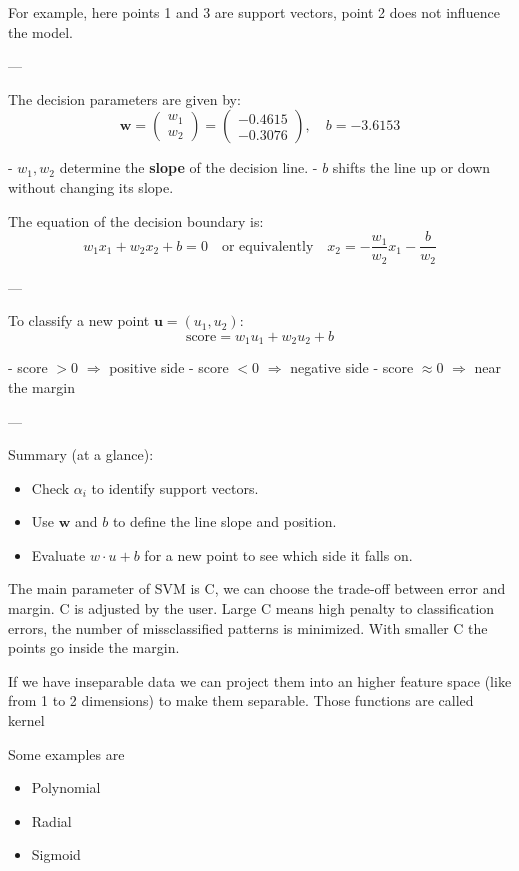 For example, here points 1 and 3 are support vectors, point 2 does not influence the model.

---

The decision parameters are given by:
\[
\mathbf{w} = 
\begin{pmatrix} w_1 \\ w_2 \end{pmatrix} =
\begin{pmatrix} -0.4615 \\ -0.3076 \end{pmatrix}, 
\quad b = -3.6153
\]

- $w_1, w_2$ determine the \textbf{slope} of the decision line.
- $b$ shifts the line up or down without changing its slope.

The equation of the decision boundary is:
\[
w_1 x_1 + w_2 x_2 + b = 0 \quad \text{or equivalently} \quad x_2 = -\frac{w_1}{w_2} x_1 - \frac{b}{w_2}
\]

---

To classify a new point $\mathbf{u} = (u_1, u_2)$:
\[
\text{score} = w_1 u_1 + w_2 u_2 + b
\]

- score $> 0$ $\Rightarrow$ positive side
- score $< 0$ $\Rightarrow$ negative side
- score $\approx 0$ $\Rightarrow$ near the margin

---

Summary (at a glance):
\begin{itemize}
    \item Check $\alpha_i$ to identify support vectors.
    \item Use $\mathbf{w}$ and $b$ to define the line slope and position.
    \item Evaluate $w \cdot u + b$ for a new point to see which side it falls on.
\end{itemize}

The main parameter of SVM is C, we can choose the trade-off between error and margin. C is adjusted by the user. Large C means high penalty to classification errors, the number of missclassified patterns is minimized. With smaller C the points go inside the margin. 

\vspace{10pt}

If we have inseparable data we can project them into an higher feature space (like from 1 to 2 dimensions) to make them separable. Those functions are called kernel

Some examples are

\begin{itemize}
    \item Polynomial
    \item Radial
    \item Sigmoid
\end{itemize}

